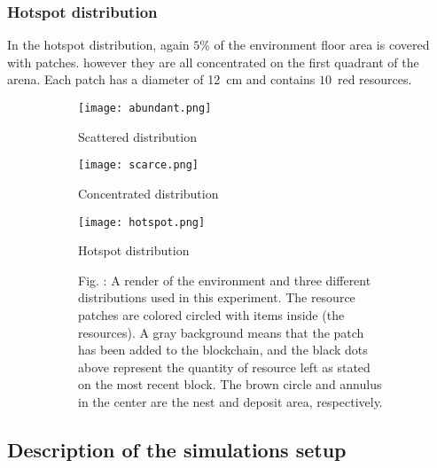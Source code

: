 \documentclass[runningheads]{llncs}
\newcommand{\fillcaption}[1]{Fig. \arabic{figure}: #1 }
\begin{document}
\vspace{-5mm}
\subsubsection{Hotspot distribution} 
In the hotspot distribution, again $5$\% of the environment floor area is covered with patches. however they are all concentrated on the first quadrant of the arena. Each patch has a diameter of 12~cm and contains $10$~red resources. 


\begin{figure}
     \centering
     \begin{subfigure}[b]{0.49\textwidth}
         \centering
         \texttt{[image: abundant.png]}
         \caption{Scattered distribution}
         \label{fig:scattered}
     \end{subfigure}
     \hfill
     \begin{subfigure}[b]{0.49\textwidth}
         \centering
         \texttt{[image: scarce.png]}
         \caption{Concentrated distribution}
         \label{fig:concentrated}
     \end{subfigure}
     \hfill
        \begin{subfigure}[b]{0.49\textwidth}
         \centering
         \texttt{[image: hotspot.png]}
         \caption{Hotspot distribution}
         \label{fig:hotspot}
    \end{subfigure}
    \hspace{2mm}
    \begin{subfigure}[t]{0.475\textwidth}
        \vspace{-55mm}
        \label{fig:distributions}
        \fillcaption{A render of the environment and three different distributions used in this experiment. The resource patches are colored circled with items inside (the resources). A gray background means that the patch has been added to the blockchain, and the black dots above represent the quantity of resource left as stated on the most recent block. The brown circle and annulus in the center are the nest and deposit area, respectively.}
    \end{subfigure}
\end{figure}


\subsection{Description of the simulations setup}
\end{document}

